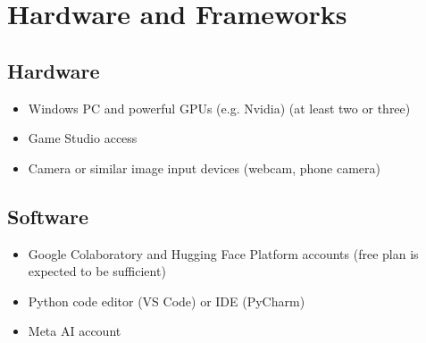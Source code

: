 \section{Hardware and Frameworks}
\subsection{Hardware}
\begin{itemize}
    \item Windows PC and powerful GPUs (e.g. Nvidia) (at least two or three)
    \item Game Studio access
    \item Camera or similar image input devices (webcam, phone camera)
\end{itemize}

\subsection{Software}
\begin{itemize}
    \item Google Colaboratory and Hugging Face Platform accounts (free plan is expected to be sufficient)
    \item Python code editor (VS Code) or IDE (PyCharm)
    \item Meta AI account
  \end{itemize}
